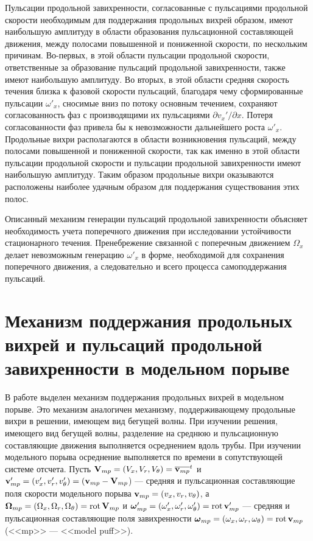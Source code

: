 Пульсации продольной завихренности, согласованные с пульсациями продольной скорости необходимым для поддержания продольных вихрей образом, имеют наибольшую амплитуду в области образования пульсационной составляющей движения, между полосами повышенной и пониженной скорости, по нескольким причинам. Во-первых, в этой области пульсации продольной скорости, ответственные за образование пульсаций продольной завихренности, также имеют наибольшую амплитуду. Во вторых, в этой области средняя скорость течения близка к фазовой скорости пульсаций, благодаря чему сформированные пульсации $\omega'_x$, сносимые вниз по потоку основным течением, сохраняют согласованность фаз с производящими их пульсациями $\partial v_x'/\partial x$. Потеря согласованности фаз привела бы к невозможности дальнейшего роста $\omega'_x$. Продольные вихри располагаются в области возникновения пульсаций, между полосами повышенной и пониженной скорости, так как именно в этой области пульсации продольной скорости и пульсации продольной завихренности имеют наибольшую амплитуду. Таким образом продольные вихри оказываются расположены наиболее удачным образом для поддержания существования этих полос. 

Описанный механизм генерации пульсаций продольной завихренности объясняет необходимость учета поперечного движения при исследовании устойчивости стационарного течения. Пренебрежение связанной с поперечным движением $\Omega_x$ делает невозможным генерацию $\omega'_x$ в форме, необходимой для сохранения поперечного движения, а следовательно и всего процесса самоподдержания пульсаций.


\section{Механизм поддержания продольных вихрей и пульсаций продольной завихренности в модельном порыве}

В работе выделен механизм поддержания продольных вихрей в модельном порыве. Это механизм аналогичен механизму, поддерживающему продольные вихри в решении, имеющем вид бегущей волны. При изучении решения, имеющего вид бегущей волны, разделение на среднюю и пульсационную составляющие движения выполняется осреднением вдоль трубы. При изучении модельного порыва осреднение выполняется по времени в сопутствующей системе отсчета. Пусть $\mathbf{V}_{mp} = (V_x, V_r, V_\theta) = \overline{\mathbf{v}_{mp}}^t$ и $\mathbf{v}'_{mp} = (v'_x, v'_r, v'_\theta) = (\mathbf{v}_{mp} - \mathbf{V}_{mp}$) --- средняя и пульсационная составляющие поля скорости модельного порыва $\mathbf{v}_{mp} = (v_x, v_r, v_\theta)$, а $\mbox{\boldmath$\Omega$}_{mp} = (\Omega_x, \Omega_r, \Omega_\theta) = \mathop{}\!\operatorname{rot} \mathbf{V}_{mp}$ и $\mbox{\boldmath$\omega$}'_{mp} = (\omega'_x, \omega'_r, \omega'_\theta) = \mathop{}\!\operatorname{rot} \mathbf{v}'_{mp}$ --- средняя и пульсационная составляющие поля завихренности $\mbox{\boldmath$\omega$}_{mp} = (\omega_x, \omega_r, \omega_\theta) = \mathop{}\!\operatorname{rot} \mathbf{v}_{mp}$ (<<mp>> --- <<model puff>>). 

